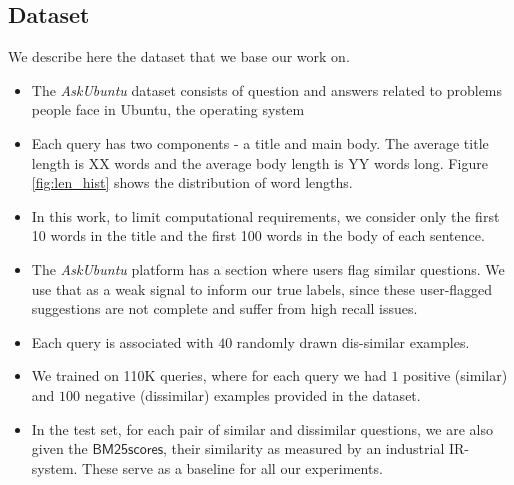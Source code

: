 \documentclass{sigkddExp}
\begin{document}
\subsection{Dataset}
We describe here the dataset that we base our work on.
\begin{itemize}[topsep=0pt,itemsep=-1ex,partopsep=1ex,parsep=1ex]
\item The \textit{AskUbuntu} dataset consists of question and answers related to problems people face in Ubuntu, the operating system
\item Each query has two components - a title and main body. The average title length is {\color{red} XX} words and the average body length is {\color{red} YY words} long. Figure \ref{fig:len_hist} shows the distribution of word lengths.
\item In this work, to limit computational requirements, we consider only the first 10 words in the title and the first 100 words in the body of each sentence.
\item The \textit{AskUbuntu} platform has a section where users flag similar questions. We use that as a weak signal to inform our true labels, since these user-flagged suggestions are not complete and suffer from high recall issues.
\item Each query is associated with $40$ randomly drawn dis-similar examples.
\item We trained on 110K queries, where for each query we had $1$ positive (similar) and $100$ negative (dissimilar) examples provided in the dataset.
\item In the test set, for each pair of similar and dissimilar questions, we are also given the $\mathsf{BM25 scores}$, their similarity as measured by an industrial IR-system. These serve as a baseline for all our experiments.
\end{itemize}
\end{document}
